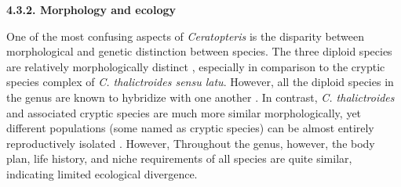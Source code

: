 \documentclass[12pt]{article}
\begin{document}
\begin{flushleft}

\textbf{4.3.2. Morphology and ecology}

One of the most confusing aspects of \textit{Ceratopteris} is the disparity between morphological and genetic distinction between species. The three diploid species are relatively morphologically distinct \autocite{LloydTax1974}, especially in comparison to the cryptic species complex of \textit{C. thalictroides sensu latu}. However, all the diploid species in the genus are known to hybridize with one another \autocite{hickok1974, Hickok1977, LloydTax1974}. In contrast, \textit{C. thalictroides} and associated cryptic species are much more similar morphologically, yet different populations (some named as cryptic species) can be almost entirely reproductively isolated \autocite{Hickok1979, Masuyama2002, Masuyama2010}. However, Throughout the genus, however, the body plan, life history, and niche requirements of all species are quite similar, indicating limited ecological divergence.


\end{flushleft}
\end{document}
